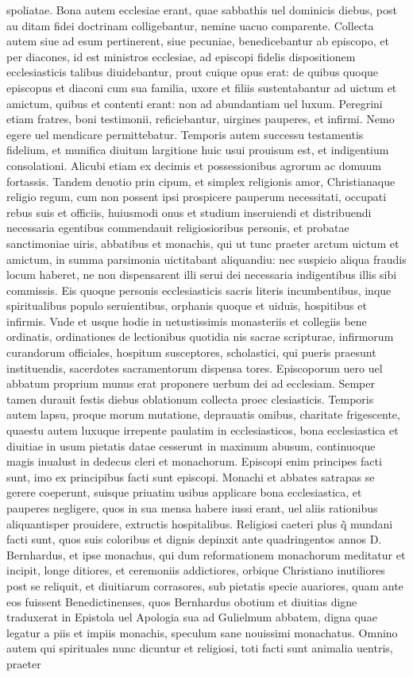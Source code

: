 \documentclass{article}
\begin{document}
\begin{pages}
\marginpar{[ p.516 ]}\pstart spoliatae. Bona autem ecclesiae erant, quae sabbathis uel dominicis diebus, post au ditam fidei doctrinam colligebantur, nemine uacuo comparente. Collecta autem siue ad esum pertinerent, siue pecuniae, benedicebantur ab episcopo, et per diacones, id est ministros ecclesiae, ad episcopi fidelis dispositionem ecclesiasticis talibus diuidebantur, prout cuique opus erat: de quibus quoque episcopus et diaconi cum sua familia, uxore et filiis sustentabantur ad uictum et amictum, quibus et contenti erant: non ad abundantiam uel luxum. Peregrini etiam fratres, boni testimonii, reficiebantur, uirgines pauperes, et infirmi. Nemo egere uel mendicare permittebatur. Temporis autem successu testamentis fidelium, et munifica diuitum largitione huic usui prouisum est, et indigentium consolationi. Alicubi etiam ex decimis et possessionibus agrorum ac domuum fortassis. Tandem deuotio prin cipum, et simplex religionis amor, Christianaque religio regum, cum non possent ipsi prospicere pauperum necessitati, occupati rebus suis et officiis, huiusmodi onus et studium inseruiendi et distribuendi necessaria egentibus commendauit religiosioribus personis, et probatae sanctimoniae uiris, abbatibus et monachis, qui ut tunc praeter arctum uictum et amictum, in summa parsimonia uictitabant aliquandiu: nec suspicio aliqua fraudis locum haberet, ne non dispensarent illi serui dei necessaria indigentibus illis sibi commissis. Eis quoque personis ecclesiasticis sacris literis incumbentibus, inque spiritualibus populo seruientibus, orphanis quoque et uiduis, hospitibus et infirmis. Vnde et usque hodie in uetustissimis monasteriis et collegiis bene ordinatis, ordinationes de lectionibus quotidia nis sacrae scripturae, infirmorum curandorum officiales, hospitum susceptores, scholastici, qui pueris praesunt instituendis, sacerdotes sacramentorum dispensa tores. Episcoporum uero uel abbatum proprium munus erat proponere uerbum dei ad ecclesiam. Semper tamen durauit festis diebus oblationum collecta proec clesiasticis. Temporis autem lapsu, proque morum mutatione, deprauatis omibus, charitate frigescente, quaestu autem luxuque irrepente paulatim in ecclesiasticos, bona ecclesiastica et diuitiae in usum pietatis datae cesserunt in maximum abusum, continuoque magis inualust in dedecus cleri et monachorum. Episcopi enim principes facti sunt, imo ex principibus facti sunt episcopi. Monachi et abbates satrapas se gerere coeperunt, suisque priuatim usibus applicare bona ecclesiastica, et pauperes negligere, quos in sua mensa habere iussi erant, uel aliis rationibus aliquantisper prouidere, extructis hospitalibus. Religiosi caeteri plus q̃ mundani facti sunt, quos suis coloribus et dignis depinxit ante quadringentos annos D. Bernhardus, et ipse monachus, qui dum reformationem monachorum meditatur et incipit, longe ditiores, et ceremoniis addictiores, orbique Christiano inutiliores post se reliquit, et diuitiarum corrasores, sub pietatis specie auariores, quam ante eos fuissent Benedictinenses, quos Bernhardus obotium et diuitias digne traduxerat in Epistola uel Apologia sua ad Gulielmum abbatem, digna quae legatur a piis et impiis monachis, speculum sane nouissimi monachatus. Omnino autem qui spirituales nunc dicuntur et religiosi, toti facti sunt animalia uentris, praeter 
\end{pages}
\end{document}
